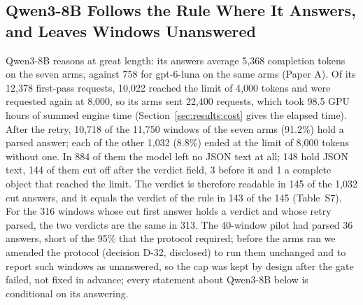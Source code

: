 \subsection{Qwen3-8B Follows the Rule Where It Answers, and Leaves Windows Unanswered}
\label{sec:results:qwen}

Qwen3-8B reasons at great length: its answers average 5{,}368 completion tokens on the seven arms, against 758 for gpt-6-luna on the same arms (Paper A). Of its 12{,}378 first-pass requests, 10{,}022 reached the limit of 4{,}000 tokens and were requested again at 8{,}000, so its arms sent 22{,}400 requests, which took 98.5 GPU hours of summed engine time (Section~\ref{sec:results:cost} gives the elapsed time). After the retry, 10{,}718 of the 11{,}750 windows of the seven arms (91.2\%) hold a parsed answer; each of the other 1{,}032 (8.8\%) ended at the limit of 8{,}000 tokens without one. In 884 of them the model left no JSON text at all; 148 hold JSON text, 144 of them cut off after the verdict field, 3 before it and 1 a complete object that reached the limit. The verdict is therefore readable in 145 of the 1{,}032 cut answers, and it equals the verdict of the rule in 143 of the 145 (Table~S7). For the 316 windows whose cut first answer holds a verdict and whose retry parsed, the two verdicts are the same in 313. The 40-window pilot had parsed 36 answers, short of the 95\% that the protocol required; before the arms ran we amended the protocol (decision D-32, disclosed) to run them unchanged and to report such windows as unanswered, so the cap was kept by design after the gate failed, not fixed in advance; every statement about Qwen3-8B below is conditional on its answering.

